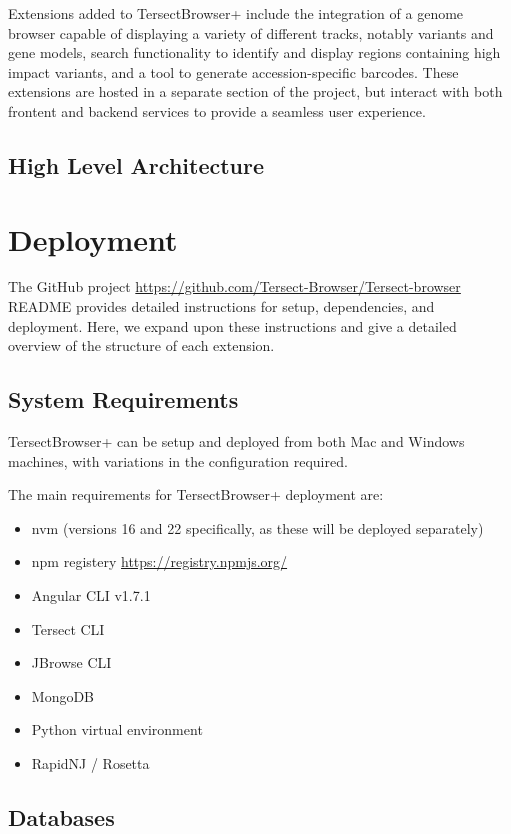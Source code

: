 \documentclass[12pt]{article}
\begin{document}
Extensions added to TersectBrowser+ include the integration of a genome browser capable of displaying a variety of different tracks, notably variants and gene models, search functionality to identify and display regions containing high impact variants, and a tool to generate accession-specific barcodes. These extensions are hosted in a separate section of the project, but interact with both frontent and backend services to provide a seamless user experience.

\subsection{High Level Architecture}

\section{Deployment}
The GitHub project \url{https://github.com/Tersect-Browser/Tersect-browser} README provides detailed instructions for setup, dependencies, and deployment. Here, we expand upon these instructions and give a detailed overview of the structure of each extension.

\subsection{System Requirements}
TersectBrowser+ can be setup and deployed from both Mac and Windows machines, with variations in the configuration required. 

The main requirements for TersectBrowser+ deployment are:
\begin{itemize}
    \item nvm (versions 16 and 22 specifically, as these will be deployed separately)
    \item npm registery \url{https://registry.npmjs.org/}
    \item Angular CLI v1.7.1
    \item Tersect CLI
    \item JBrowse CLI
    \item MongoDB
    \item Python virtual environment
    \item RapidNJ / Rosetta
\end{itemize}

\subsection{Databases}
\end{document}

